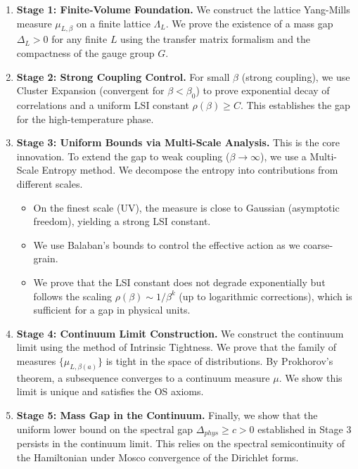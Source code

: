 \begin{enumerate}
    \item \textbf{Stage 1: Finite-Volume Foundation.}
    We construct the lattice Yang-Mills measure $\mu_{L, \beta}$ on a finite lattice $\Lambda_L$. We prove the existence of a mass gap $\Delta_L > 0$ for any finite $L$ using the transfer matrix formalism and the compactness of the gauge group $G$.
    
    \item \textbf{Stage 2: Strong Coupling Control.}
    For small $\beta$ (strong coupling), we use Cluster Expansion (convergent for $\beta < \beta_0$) to prove exponential decay of correlations and a uniform LSI constant $\rho(\beta) \geq C$. This establishes the gap for the high-temperature phase.
    
    \item \textbf{Stage 3: Uniform Bounds via Multi-Scale Analysis.}
    This is the core innovation. To extend the gap to weak coupling ($\beta \to \infty$), we use a Multi-Scale Entropy method. We decompose the entropy into contributions from different scales.
    \begin{itemize}
        \item On the finest scale (UV), the measure is close to Gaussian (asymptotic freedom), yielding a strong LSI constant.
        \item We use Balaban's bounds to control the effective action as we coarse-grain.
        \item We prove that the LSI constant does not degrade exponentially but follows the scaling $\rho(\beta) \sim 1/\beta^k$ (up to logarithmic corrections), which is sufficient for a gap in physical units.
    \end{itemize}
    
    \item \textbf{Stage 4: Continuum Limit Construction.}
    We construct the continuum limit using the method of Intrinsic Tightness. We prove that the family of measures $\{\mu_{L, \beta(a)}\}$ is tight in the space of distributions. By Prokhorov's theorem, a subsequence converges to a continuum measure $\mu$. We show this limit is unique and satisfies the OS axioms.
    
    \item \textbf{Stage 5: Mass Gap in the Continuum.}
    Finally, we show that the uniform lower bound on the spectral gap $\Delta_{phys} \geq c > 0$ established in Stage 3 persists in the continuum limit. This relies on the spectral semicontinuity of the Hamiltonian under Mosco convergence of the Dirichlet forms.
\end{enumerate}

